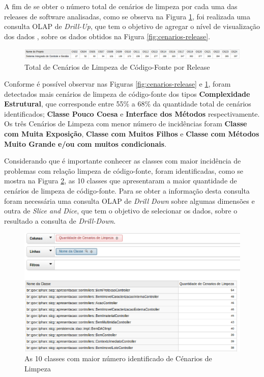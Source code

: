 A fim de se obter o número total de cenários de limpeza por cada uma das releases de software analisadas, como se observa na Figura \ref{fig:cenarios-total}, foi realizada uma consulta OLAP de \textit{Drill-Up}, que tem o objetivo de agregar o nível de visualização dos dados \cite{Kimball2002}, sobre os dados obtidos na Figura \ref{fig:cenarios-release}.

\begin{figure}[ht!]
\centering
\includegraphics[keepaspectratio=true,scale=0.45]{figuras/total-cenarios-release.eps}
\caption{Total de Cenários de Limpeza de Código-Fonte por Release}
\label{fig:cenarios-total}
\end{figure}
\FloatBarrier

Conforme é possível observar nas Figuras \ref{fig:cenarios-release} e \ref{fig:cenarios-total}, foram detectados mais cenários de limpeza de código-fonte dos tipos \textbf{Complexidade Estrutural}, que corresponde entre 55\% a 68\% da quantidade total de cenários identificados; \textbf{Classe Pouco Coesa} e \textbf{Interface dos Métodos} respectivamente. Os três Cenários de Limpeza com menor número de incidências foram \textbf{Classe com Muita Exposição}, \textbf{Classe com Muitos Filhos} e \textbf{Classe com Métodos Muito Grande e/ou com muitos condicionais}.

Considerando que é importante conhecer as classes com maior incidência de problemas com relação limpeza de código-fonte, foram identificadas, como se mostra na Figura \ref{fig:worst-10-cenarios}, as 10 classes que apresentaram a maior quantidade de cenários de limpeza de código-fonte. Para se obter a informação desta consulta foram necessária uma consulta OLAP de \textit{Drill Down} sobre algumas dimensões e outra de \textit{Slice and Dice}, que tem o objetivo de selecionar os dados, sobre o resultado a consulta de \textit{Drill-Down}.    

\begin{figure}[ht!]
\centering
\includegraphics[keepaspectratio=true,scale=0.55]{figuras/10-best.eps}
\caption{As 10 classes com maior número identificado de Cénarios de Limpeza}
\label{fig:worst-10-cenarios}
\end{figure}
\FloatBarrier

